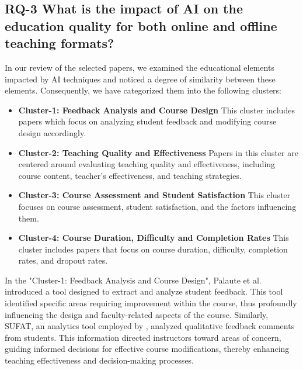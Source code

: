 \subsection{\textbf{RQ-3 What is the impact of AI on the education quality for both online and offline teaching formats?}}
 \label{RQ3_analysis}

In our review of the selected papers, we examined the educational elements impacted by AI techniques and noticed a degree of similarity between these elements. Consequently, we have categorized them into the following clusters:

\begin{itemize}
\item \textbf{Cluster-1: Feedback Analysis and Course Design}
This cluster includes papers which focus on analyzing student feedback and modifying course design accordingly.

\item \textbf{Cluster-2: Teaching Quality and Effectiveness}
Papers in this cluster are centered around evaluating teaching quality and effectiveness, including course content, teacher's effectiveness, and teaching strategies.

\item \textbf{Cluster-3: Course Assessment and Student Satisfaction}
This cluster focuses on course assessment, student satisfaction, and the factors influencing them.

\item \textbf{Cluster-4: Course Duration, Difficulty and Completion Rates}
This cluster includes papers that focus on course duration, difficulty, completion rates, and dropout rates.
\end{itemize}

In the "Cluster-1: Feedback Analysis and Course Design", Palaute et al. \cite{Palaute:_An_Online_Text_Mining_Tool_for_Analyzing_Written_Student_Course_Feedback} introduced a tool designed to extract and analyze student feedback. This tool identified specific areas requiring improvement within the course, thus profoundly influencing the design and faculty-related aspects of the course. Similarly, SUFAT, an analytics tool employed by \cite{SUFAT_An_Analytics_Tool_for_Gaining_Insights_from_Student_Feedback_Comments}, analyzed qualitative feedback comments from students. This information directed instructors toward areas of concern, guiding informed decisions for effective course modifications, thereby enhancing teaching effectiveness and decision-making processes.

